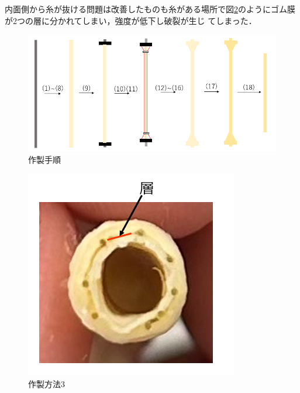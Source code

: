 内面側から糸が抜ける問題は改善したものも糸がある場所で図\ref{fig:25}のようにゴム膜が2つの層に分かれてしまい，強度が低下し破裂が生じ
てしまった．
\begin{figure}[t]
  \centering  %
  \includegraphics[scale=0.4]{pic/2211.PNG}
  \caption{作製手順}
  \label{fig:24}
\end{figure}
\begin{figure}[h]
  \centering  %
  \includegraphics[scale=0.8]{pic/24.PNG}
  \caption{作製方法3}
  \label{fig:25}
\end{figure}
\newpage
